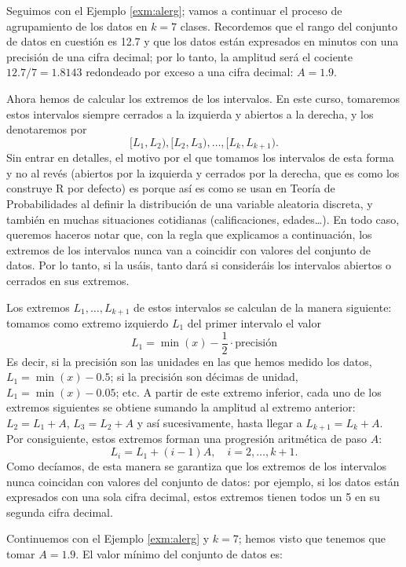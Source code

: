 \documentclass[]{book}
\theoremstyle{definition}
\theoremstyle{definition}
\theoremstyle{definition}
\theoremstyle{remark}
\let\BeginKnitrBlock\begin \let\EndKnitrBlock\end
\begin{document}
\BeginKnitrBlock{example}
\protect\hypertarget{exm:unnamed-chunk-619}{}{\label{exm:unnamed-chunk-619} }Seguimos con el Ejemplo \ref{exm:alerg}; vamos a continuar el proceso de agrupamiento de los datos en \(k=7\) clases. Recordemos que el rango del conjunto de datos en cuestión es 12.7 y que los datos están expresados en minutos con una precisión de una cifra decimal; por lo tanto, la amplitud será el cociente \(12.7/7=1.8143\) redondeado por exceso a una cifra decimal: \(A=1.9\).
\EndKnitrBlock{example}

Ahora hemos de calcular los extremos de los intervalos. En este curso, tomaremos estos intervalos siempre cerrados a la izquierda y abiertos a la derecha, y los denotaremos por
\[
[L_1,L_2),[L_2,L_3),\ldots, [L_k,L_{k+1}).
\]
Sin entrar en detalles, el motivo por el que tomamos los intervalos de esta forma y no al revés (abiertos por la izquierda y cerrados por la derecha, que es como los construye R por defecto) es porque así es como se usan en Teoría de Probabilidades al definir la distribución de una variable aleatoria discreta, y también en muchas situaciones cotidianas (calificaciones, edades\ldots{}). En todo caso, queremos haceros notar que, con la regla que explicamos a continuación, los extremos de los intervalos nunca van a coincidir con valores del conjunto de datos. Por lo tanto, si la usáis, tanto dará si consideráis los intervalos abiertos o cerrados en sus extremos.

Los extremos \(L_1,\ldots,L_{k+1}\) de estos intervalos se calculan de la manera siguiente: tomamos como extremo izquierdo \(L_1\) del primer intervalo el valor
\[
L_1=\min(x)-\frac{1}{2}\cdot \text{precisión} 
\]
Es decir, si la precisión son las unidades en las que hemos medido los datos, \(L_1=\min(x)-0.5\); si la precisión son décimas de unidad, \(L_1=\min(x)-0.05\); etc. A partir de este extremo inferior, cada uno de los extremos siguientes se obtiene sumando la amplitud al extremo anterior: \(L_2=L_1+A\), \(L_3=L_{2}+A\) y así sucesivamente, hasta llegar a \(L_{k+1}=L_{k}+A\). Por consiguiente, estos extremos forman una progresión aritmética de paso \(A\):
\[
L_i=L_1+(i-1)A,\quad i=2,\ldots,k+1.
\]
Como decíamos, de esta manera se garantiza que los extremos de los intervalos nunca coincidan con valores del conjunto de datos: por ejemplo, si los datos están expresados con una sola cifra decimal, estos extremos tienen todos un 5 en su segunda cifra decimal.

\BeginKnitrBlock{example}
\protect\hypertarget{exm:unnamed-chunk-620}{}{\label{exm:unnamed-chunk-620} }Continuemos con el Ejemplo \ref{exm:alerg} y \(k=7\); hemos visto que tenemos que tomar \(A=1.9\). El valor mínimo del conjunto de datos es:
\EndKnitrBlock{example}
\end{document}
